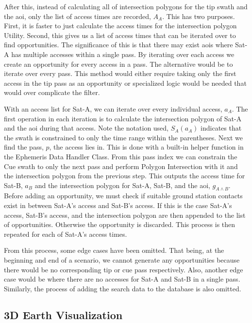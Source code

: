 After this, instead of calculating all of intersection polygons for the tip
swath and the \gls{aoi}, only the list of access times are recorded, $A_A$.
This has two purposes.  First, it is faster to just calculate the access times
for the intersection polygon Utility. Second, this gives us a list of access
times that can be iterated over to find opportunities. The significance of this
is that there may exist \glspl{aoi} where Sat-A has multiple accesses within a
single pass. By iterating over each access we create an opportunity for every
access in a pass.  The alternative would be to iterate over every pass. This
method would either require taking only the first access in the tip pass as an
opportunity or specialized logic would be needed that would over complicate the
filter.

With an access list for Sat-A, we can iterate over every individual access,
$a_A$. The first operation in each iteration is to calculate the intersection
polygon of Sat-A and the \gls{aoi} during that access. Note the notation used,
$S_A(a_A)$ indicates that the swath is constrained to only the time range
within the parentheses. Next we find the pass, $p$, the access lies in.  This
is done with a built-in helper function in the Ephemeris Data Handler Class.
From this pass index we can constrain the Cue swath to only the next pass and perform
Polygon Intersection with it and the intersection polygon from the previous
step. This outputs the access time for Sat-B, $a_B$ and the intersection
polygon for Sat-A, Sat-B, and the \gls{aoi}, $g_{A \wedge B}$. Before adding an
opportunity, we must check if suitable ground station contacts exist in between
Sat-A's access and Sat-B's access. If this is the case Sat-A's access, Sat-B's
access, and the intersection polygon are then appended to the list of
opportunities. Otherwise the opportunity is discarded. This process is then
repeated for each of Sat-A's access times.

From this process, some edge cases have been omitted. That being, at the
beginning and end of a scenario, we cannot generate any opportunities because
there would be no corresponding tip or cue pass respectively. Also, another
edge case would be where there are no accesses for Sat-A and Sat-B in a single
pass. Similarly, the process of adding the search data to the database is also
omitted.


\subsection{3D Earth Visualization}

